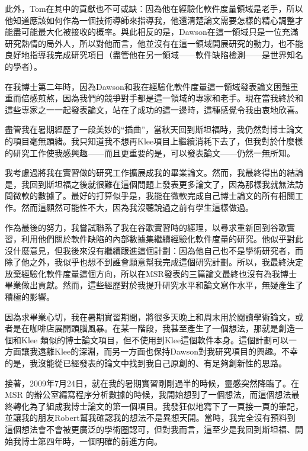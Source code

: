 \documentclass[12pt,UTF8,nofonts]{book}
\begin{document}
此外，Tom在其中的貢獻也不可或缺：因為他在經驗化軟件度量領域是老手，所以他知道應該如何作為一個技術導師來指導我，他還清楚論文需要怎樣的精心調整才能盡可能最大化被接收的概率。與此相反的是，Dawson在這一領域只是一位充滿研究熱情的局外人，所以對他而言，他並沒有在這一領域開展研究的動力，也不能良好地指導我完成研究項目（盡管他在另一領域——軟件缺陷檢測——是世界知名的學者）。

在我博士第二年時，因為Dawson和我在經驗化軟件度量這一領域發表論文困難重重而倍感煎熬，因為我們的競爭對手都是這一領域的專家和老手。現在當我終於和這些專家之一一起發表論文，站在了成功的這一邊時，這種感覺令我由衷地欣喜。

\breakline

盡管我在暑期經歷了一段美妙的“插曲”，當秋天回到斯坦福時，我仍然對博士論文的項目毫無頭緒。我只知道我不想再Klee項目上繼續消耗下去了，但我對於什麼樣的研究工作使我感興趣——而且更重要的是，可以發表論文——仍然一無所知。

我考慮過將我在實習做的研究工作擴展成我的畢業論文。然而，我最終得出的結論是，我回到斯坦福之後就很難在這個問題上發表更多論文了，因為那樣我就無法訪問微軟的數據了。最好的打算似乎是，我能在微軟完成自己博士論文的所有相關工作。然而這顯然可能性不大，因為我沒聽說過之前有學生這樣做過。

作為最後的努力，我嘗試聯系了我在谷歌實習時的經理，以尋求重新回到谷歌實習，利用他們關於軟件缺陷的內部數據集繼續經驗化軟件度量的研究。他似乎對此沒什麼意見，但我後來沒有繼續跟進這個計劃：因為他自己也不是學術研究者，而除了他之外，我似乎也想不到誰會願意幫我完成這個研究計劃。所以，我最終決定放棄經驗化軟件度量這個方向，所以在MSR發表的三篇論文最終也沒有為我博士畢業做出貢獻。然而，這些經歷對於我提升研究水平和論文寫作水平，無疑產生了積極的影響。

因為求畢業心切，我在暑期實習期間，將很多天晚上和周末用於閱讀學術論文，或者是在咖啡店展開頭腦風暴。在某一階段，我甚至產生了一個想法，那就是創造一個和Klee 類似的博士論文項目，但不使用到Klee這個軟件本身。這個計劃可以一方面讓我遠離Klee的深淵，而另一方面也保持Dawson對我研究項目的興趣。不幸的是，我沒能從已經發表的論文中找到我自己原創的、有足夠創新性的思路。

接著，2009年7月24日，就在我的暑期實習剛剛過半的時候，靈感突然降臨了。在MSR 的辦公室編寫程序分析數據的時候，我開始想到了一個想法，而這個想法最終轉化為了組成我博士論文的第一個項目。我發狂似地寫下了一頁接一頁的筆記，並讓我的朋友Robert幫我確認我的想法不是異想天開。當時，我完全沒有預料到這個想法會不會被更廣泛的學術圈認可，但對我而言，這至少是我回到斯坦福、開始我博士第四年時，一個明確的前進方向。

\end{document}
